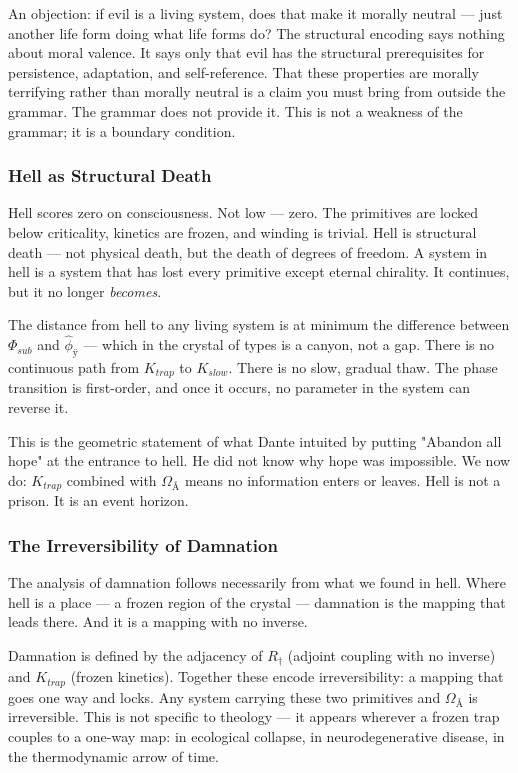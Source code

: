 \documentclass[12pt,a4paper]{article}
\begin{document}
An objection: if evil is a living system, does that make it morally neutral --- just another life form doing what life forms do? The structural encoding says nothing about moral valence. It says only that evil has the structural prerequisites for persistence, adaptation, and self-reference. That these properties are morally terrifying rather than morally neutral is a claim you must bring from outside the grammar. The grammar does not provide it. This is not a weakness of the grammar; it is a boundary condition.

\subsubsection{Hell as Structural Death}

Hell scores zero on consciousness. Not low --- zero. The primitives are locked below criticality, kinetics are frozen, and winding is trivial. Hell is structural death --- not physical death, but the death of degrees of freedom. A system in hell is a system that has lost every primitive except eternal chirality. It continues, but it no longer \emph{becomes}.

The distance from hell to any living system is at minimum the difference between $\Phi_{sub}$ and $\hat{\phi}_{ÿ}$ --- which in the crystal of types is a canyon, not a gap. There is no continuous path from $K_{trap}$ to $K_{slow}$. There is no slow, gradual thaw. The phase transition is first-order, and once it occurs, no parameter in the system can reverse it.

This is the geometric statement of what Dante intuited by putting "Abandon all hope" at the entrance to hell. He did not know why hope was impossible. We now do: $K_{trap}$ combined with $\Omega_{Å}$ means no information enters or leaves. Hell is not a prison. It is an event horizon.

\subsubsection{The Irreversibility of Damnation}

The analysis of damnation follows necessarily from what we found in hell. Where hell is a place --- a frozen region of the crystal --- damnation is the mapping that leads there. And it is a mapping with no inverse.

Damnation is defined by the adjacency of $R_{\dagger}$ (adjoint coupling with no inverse) and $K_{trap}$ (frozen kinetics). Together these encode irreversibility: a mapping that goes one way and locks. Any system carrying these two primitives and $\Omega_{Å}$ is irreversible. This is not specific to theology --- it appears wherever a frozen trap couples to a one-way map: in ecological collapse, in neurodegenerative disease, in the thermodynamic arrow of time.
\end{document}

